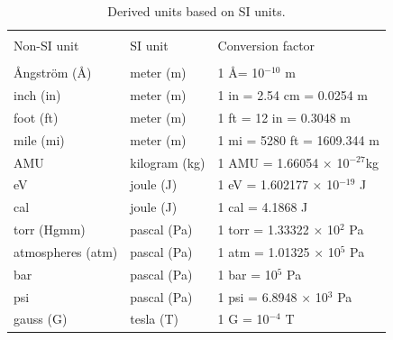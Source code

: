 \documentclass[byrevtex,amssymb,aps,pra,floatfix,letterpaper]{revtex4}
\begin{document}
\begin{table}[!htp]
\caption{Derived units based on SI units.}
\begin{tabular}{l@{\extracolsep{1cm}}l@{\extracolsep{2cm}}l}
 & & \\
Non-SI unit & SI unit & Conversion factor\\
\cline{1-3}\\
\AA ngstr\"om (\AA) & meter (m) & 1 \AA = 10$^{-10}$ m\\
inch (in)  &  meter (m)  &   1 in = 2.54 cm = 0.0254 m\\
foot (ft)  &  meter (m)  &   1 ft = 12 in = 0.3048 m\\
mile (mi)  &  meter (m)  &   1 mi = 5280 ft = 1609.344 m\\
AMU        &  kilogram (kg) & 1 AMU = 1.66054 $\times$ 10$^{-27}$kg\\
eV    &       joule (J) & 1 eV = 1.602177 $\times$ 10$^{-19}$ J\\
cal   &       joule (J) &  1 cal = 4.1868 J\\
torr (Hgmm) &       pascal (Pa) & 1 torr = 1.33322 $\times$ 10$^2$ Pa\\
atmospheres (atm) & pascal (Pa) & 1 atm = 1.01325 $\times$ 10$^5$ Pa\\
bar      &         pascal (Pa) & 1 bar = 10$^5$ Pa\\
psi      &        pascal (Pa) & 1 psi = 6.8948 $\times$ 10$^3$ Pa\\
gauss (G)  &       tesla (T) & 1 G = 10$^{-4}$ T\\
\end{tabular}
\label{table3}
\end{table}
\end{document}
